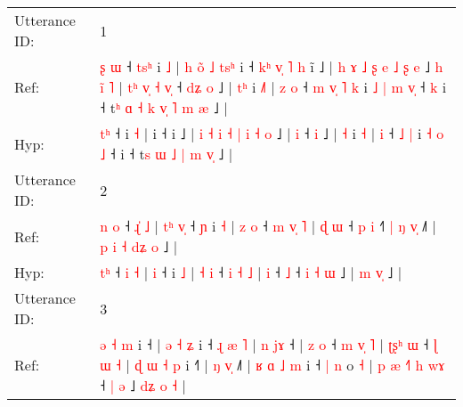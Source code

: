 \documentclass[10pt]{article}
\DeclareRobustCommand{\hl}[1]{{\textcolor{red}{#1}}}
\begin{document}
\begin{longtable}{ll}
\toprule
Utterance ID: & 1 \\
Ref: & \hl{ʂ}\hl{ }\hl{ɯ} ˧\hl{ }\hl{t}\hl{s}\hl{ʰ} i \hl{˩} |\hl{ }\hl{h}\hl{ }\hl{o}\hl{̃}\hl{ }\hl{˩}\hl{ }\hl{t}\hl{s}\hl{ʰ} i ˧\hl{ }\hl{k}\hl{ʰ}\hl{ }\hl{v}\hl{̩}\hl{ }\hl{˥}\hl{ }\hl{h} i\hl{̃} ˩ | \hl{h} \hl{ɤ} \hl{˩} \hl{ʂ} \hl{e} \hl{˩} \hl{ʂ} \hl{e} ˩\hl{ }\hl{h}\hl{ }\hl{i}\hl{̃}\hl{ }\hl{˥} |\hl{ }\hl{t}\hl{ʰ}\hl{ }\hl{v}\hl{̩}\hl{ }\hl{˧} \hl{v}\hl{̩} ˧\hl{ }\hl{d}\hl{ʑ} \hl{o} ˩ | \hl{t}\hl{ʰ} i \hl{˩}\hl{˥} |\hl{ }\hl{z} \hl{o} ˧\hl{ }\hl{m}\hl{ }\hl{v}\hl{̩} \hl{˥} \hl{k} i\hl{ }\hl{˩} \hl{|} \hl{m} \hl{v}\hl{̩} ˧\hl{ }\hl{k} i ˧ t\hl{ʰ}\hl{ }\hl{ɑ} \hl{˧} \hl{k} \hl{v}\hl{̩} \hl{˥} \hl{m}\hl{ }\hl{æ} ˩ |
 \\
Hyp: & \hl{}\hl{t}\hl{ʰ} ˧\hl{}\hl{}\hl{}\hl{} i \hl{˧} |\hl{}\hl{}\hl{}\hl{}\hl{}\hl{}\hl{}\hl{}\hl{}\hl{}\hl{} i ˧\hl{}\hl{}\hl{}\hl{}\hl{}\hl{}\hl{}\hl{}\hl{}\hl{} i\hl{} ˩ | \hl{i} \hl{˧} \hl{i} \hl{˧} \hl{|} \hl{i} \hl{˧} \hl{o} ˩\hl{}\hl{}\hl{}\hl{}\hl{}\hl{}\hl{} |\hl{}\hl{}\hl{}\hl{}\hl{}\hl{}\hl{}\hl{} \hl{}\hl{i} ˧\hl{}\hl{}\hl{} \hl{i} ˩ | \hl{}\hl{˧} i \hl{}\hl{˧} |\hl{}\hl{} \hl{i} ˧\hl{}\hl{}\hl{}\hl{}\hl{} \hl{˩} \hl{|} i\hl{}\hl{} \hl{˧} \hl{o} \hl{}\hl{˩} ˧\hl{}\hl{} i ˧ t\hl{}\hl{}\hl{s} \hl{ɯ} \hl{˩} \hl{}\hl{|} \hl{m} \hl{}\hl{v}\hl{̩} ˩ |
 \\
\midrule
Utterance ID: & 2 \\
Ref: & \hl{n}\hl{ }\hl{o} ˧ \hl{ɻ}\hl{̍} \hl{˩} |\hl{ }\hl{t}\hl{ʰ} \hl{v}\hl{̩} ˧\hl{ }\hl{ɲ} i \hl{˧} | \hl{z} \hl{o} ˧ \hl{m} \hl{v}\hl{̩} \hl{˥} |\hl{ }\hl{ɖ} \hl{ɯ} ˧\hl{ }\hl{p} \hl{i} ˧\hl{˥} \hl{|} \hl{ŋ} \hl{v}\hl{̩} ˩\hl{˥} |\hl{ }\hl{p}\hl{ }\hl{i} \hl{˧} \hl{d}\hl{ʑ}\hl{ }\hl{o} ˩ |
 \\
Hyp: & \hl{}\hl{t}\hl{ʰ} ˧ \hl{}\hl{i} \hl{˧} |\hl{}\hl{}\hl{} \hl{}\hl{i} ˧\hl{}\hl{} i \hl{˩} | \hl{˧} \hl{i} ˧ \hl{i} \hl{}\hl{˧} \hl{˩} |\hl{}\hl{} \hl{i} ˧\hl{}\hl{} \hl{˩} ˧\hl{} \hl{i} \hl{˧} \hl{}\hl{ɯ} ˩\hl{} |\hl{}\hl{}\hl{}\hl{} \hl{m} \hl{}\hl{}\hl{v}\hl{̩} ˩ |
 \\
\midrule
Utterance ID: & 3 \\
Ref: & \hl{ə}\hl{ }\hl{˧} \hl{m} i ˧ |\hl{ }\hl{ə}\hl{ }\hl{˧}\hl{ }\hl{ʑ} i ˧\hl{ }\hl{ɻ} \hl{æ} \hl{˥} | \hl{n} \hl{j}\hl{ɤ} ˧ |\hl{ }\hl{z} \hl{o} ˧\hl{ }\hl{m} \hl{v}\hl{̩} \hl{˥} |\hl{ }\hl{ʈ}\hl{ʂ}\hl{ʰ} \hl{ɯ} ˧\hl{ }\hl{ɭ} \hl{ɯ} \hl{˧} |\hl{ }\hl{ɖ}\hl{ }\hl{ɯ}\hl{ }\hl{˧}\hl{ }\hl{p} i ˧\hl{˥} | \hl{ŋ} \hl{v}\hl{̩} ˩\hl{˥} |\hl{ }\hl{ʁ}\hl{ }\hl{ɑ}\hl{ }\hl{˩}\hl{ }\hl{m} i ˧\hl{ }\hl{|}\hl{ }\hl{n} o \hl{˧} |\hl{ }\hl{p}\hl{ }\hl{æ}\hl{ }\hl{˧}\hl{˥}\hl{ }\hl{h} \hl{w}\hl{ɤ} ˧\hl{ }\hl{|} \hl{ə} ˩\hl{ }\hl{d}\hl{ʑ}\hl{ }\hl{o}\hl{ }\hl{˧} |

\end{longtable}
\end{document}
